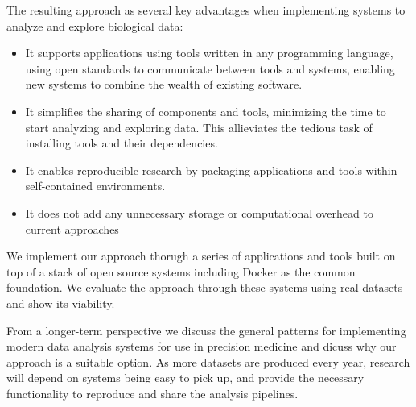 The resulting approach as several key advantages when implementing systems to
analyze and explore biological data:
\begin{itemize} 
    
    \item It supports applications using tools written in any programming
        language, using open standards to communicate between tools and systems,
        enabling new systems to combine the wealth of existing software. 
    \item It simplifies the sharing of components and tools, minimizing the time
        to start analyzing and exploring data. This allieviates the tedious
        task of installing tools and their dependencies. 
    \item It enables reproducible research by packaging applications
        and tools within self-contained environments.
    \item It does not add any unnecessary storage or computational  overhead to
        current approaches
\end{itemize} 

We implement our approach thorugh a series of applications and tools built on
top of a stack of open source systems including Docker as the common foundation.
We evaluate the approach through these systems using real datasets and show its
viability. 

From a longer-term perspective we discuss the general patterns for implementing
modern data analysis systems for use in precision medicine and dicuss why our
approach is a suitable option. As more datasets are produced every year,
research will depend on systems being easy to pick up, and provide the necessary
functionality to reproduce and share the analysis pipelines. 


